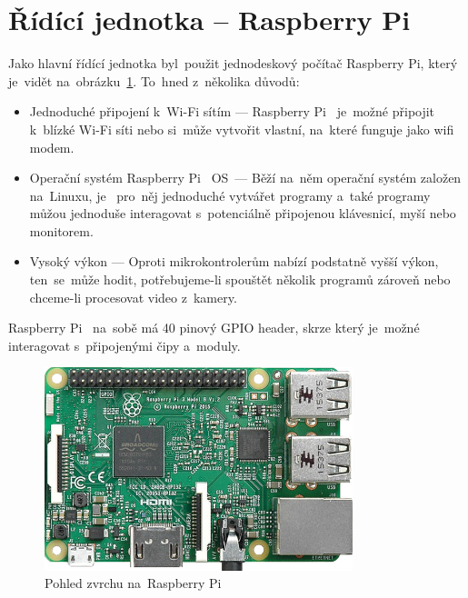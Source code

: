 \section{Řídící jednotka -- Raspberry Pi}
Jako hlavní řídící jednotka  byl~použit jednodeskový počítač Raspberry Pi, který je~vidět na~obrázku~\ref{fig:RPi}. To~hned  z~několika důvodů:
\begin{itemize}
  \item Jednoduché připojení  k~Wi-Fi sítím --- Raspberry Pi ~je~možné připojit  k~blízké Wi-Fi síti nebo si~může vytvořit vlastní, na~které funguje jako wifi modem.
  \item Operační systém Raspberry Pi ~OS~--- Běží na~něm operační systém založen na~Linuxu, je ~pro~něj jednoduché vytvářet programy  a~také programy můžou jednoduše interagovat  s~potenciálně připojenou klávesnicí, myší nebo monitorem.
  \item Vysoký výkon --- Oproti mikrokontrolerům nabízí podstatně vyšší výkon,  ten~se~může hodit, potřebujeme-li spouštět několik programů zároveň nebo chceme-li procesovat video  z~kamery.
\end{itemize}
Raspberry Pi ~na~sobě má 40 pinový GPIO header, skrze který je~možné interagovat  s~připojenými čipy  a~moduly.

\begin{figure}[htb]
    \centering
  \includegraphics[width=0.8\textwidth]{img/RPi.png}
  \caption{\label{fig:RPi} Pohled zvrchu na~Raspberry Pi~\cite{rpi-image}}
\end{figure}












